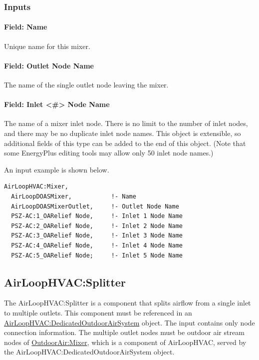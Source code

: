 \subsubsection{Inputs}\label{inputs-5-002}

\paragraph{Field: Name}\label{field-name-5-002}

Unique name for this mixer.

\paragraph{Field: Outlet Node Name}\label{field-outlet-node-name-3}

The name of the single outlet node leaving the mixer.

\paragraph{Field: Inlet \textless{}\#\textgreater{} Node Name}\label{field-inlet-node-name-3}

The name of a mixer inlet node. There is no limit to the number of inlet nodes, and there may be no duplicate inlet node names.  This object is extensible, so additional fields of this type can be added to the end of this object.  (Note that some EnergyPlus editing tools may allow only 50 inlet node names.)

An input example is shown below.

\begin{lstlisting}
AirLoopHVAC:Mixer,
  AirLoopDOASMixer,           !- Name
  AirLoopDOASMixerOutlet,     !- Outlet Node Name
  PSZ-AC:1_OARelief Node,     !- Inlet 1 Node Name
  PSZ-AC:2_OARelief Node,     !- Inlet 2 Node Name
  PSZ-AC:3_OARelief Node,     !- Inlet 3 Node Name
  PSZ-AC:4_OARelief Node,     !- Inlet 4 Node Name
  PSZ-AC:5_OARelief Node;     !- Inlet 5 Node Name
\end{lstlisting}

\subsection{AirLoopHVAC:Splitter}\label{airloophvacsplitter}

The AirLoopHVAC:Splitter is a component that splits airflow from a single inlet to multiple outlets. This component must be referenced in an \hyperref[airloophvacdedicatedoutdoorairsystem]{AirLoopHVAC:DedicatedOutdoorAirSystem} object. The input contains only node connection information. The multiple outlet nodes must be outdoor air stream nodes of \hyperref[outdoorairmixer]{OutdoorAir:Mixer}, which is a component of AirLoopHVAC, served by the AirLoopHVAC:DedicatedOutdoorAirSystem object.

